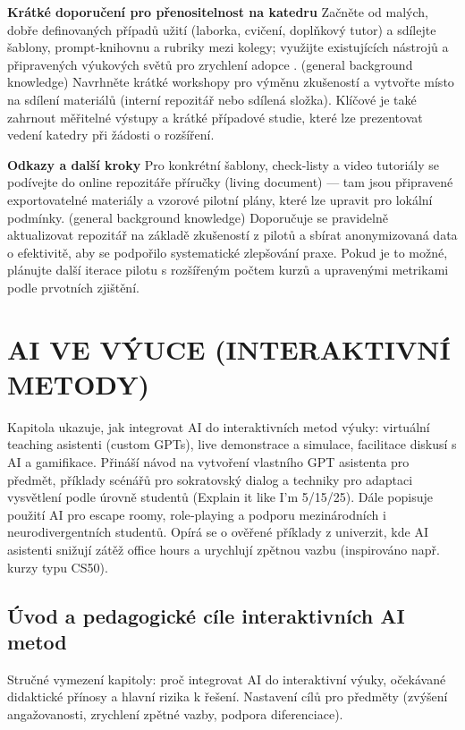 \documentclass{report}%
\begin{document}
\bigskip
\noindent \textbf{Krátké doporučení pro přenositelnost na katedru}  
Začněte od malých, dobře definovaných případů užití (laborka, cvičení, doplňkový tutor) a sdílejte šablony, prompt‑knihovnu a rubriky mezi kolegy; využijte existujících nástrojů a připravených výukových světů pro zrychlení adopce \cite{kb_ai_101_tipu_pdf_04e4a115_page_15_2, kb_ai_101_tipu_pdf_04e4a115_page_8_1}. (general background knowledge)
Navrhněte krátké workshopy pro výměnu zkušeností a vytvořte místo na sdílení materiálů (interní repozitář nebo sdílená složka).
Klíčové je také zahrnout měřitelné výstupy a krátké případové studie, které lze prezentovat vedení katedry při žádosti o rozšíření.

\bigskip
\noindent \textbf{Odkazy a další kroky}  
Pro konkrétní šablony, check‑listy a video tutoriály se podívejte do online repozitáře příručky (living document) — tam jsou připravené exportovatelné materiály a vzorové pilotní plány, které lze upravit pro lokální podmínky. (general background knowledge)
Doporučuje se pravidelně aktualizovat repozitář na základě zkušeností z pilotů a sbírat anonymizovaná data o efektivitě, aby se podpořilo systematické zlepšování praxe.
Pokud je to možné, plánujte další iterace pilotu s rozšířeným počtem kurzů a upravenými metrikami podle prvotních zjištění.%

%
\chapter{AI VE VÝUCE (INTERAKTIVNÍ METODY)}%
Kapitola ukazuje, jak integrovat AI do interaktivních metod výuky: virtuální teaching asistenti (custom GPTs), live demonstrace a simulace, facilitace diskusí s AI a gamifikace. Přináší návod na vytvoření vlastního GPT asistenta pro předmět, příklady scénářů pro sokratovský dialog a techniky pro adaptaci vysvětlení podle úrovně studentů (Explain it like I'm 5/15/25). Dále popisuje použití AI pro escape roomy, role‑playing a podporu mezinárodních i neurodivergentních studentů. Opírá se o ověřené příklady z univerzit, kde AI asistenti snižují zátěž office hours a urychlují zpětnou vazbu (inspirováno např. kurzy typu CS50).%
\section{Úvod a pedagogické cíle interaktivních AI metod}%
Stručné vymezení kapitoly: proč integrovat AI do interaktivní výuky, očekávané didaktické přínosy a hlavní rizika k řešení. Nastavení cílů pro předměty (zvýšení angažovanosti, zrychlení zpětné vazby, podpora diferenciace).%
\end{document}
